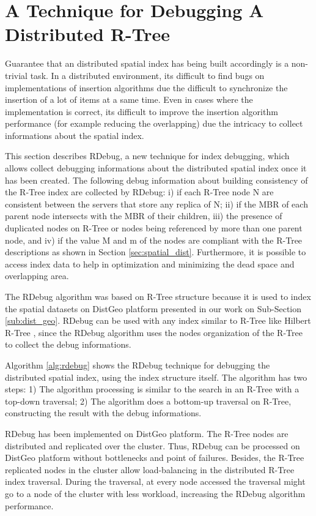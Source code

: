 \section{A Technique for Debugging A Distributed R-Tree}

\label{sec:rdebug}
Guarantee that an distributed spatial index has being built accordingly is a non-trivial task. 
In a distributed environment, its difficult to find bugs on implementations of insertion algorithms due the difficult to synchronize the insertion of a lot of items at a same time. 
Even in cases where the implementation is correct, its difficult to improve the insertion algorithm performance (for example reducing the overlapping) 
due the intricacy to collect informations about the spatial index.

This section describes RDebug, a new technique for index debugging, which allows collect debugging informations about the distributed spatial index once it has been created. 
The following debug information about building consistency of the R-Tree index are collected by RDebug: 
i) if each R-Tree node N are consistent between the servers that store any replica of N;
ii) if the MBR of each parent node intersects with the MBR of their children, 
iii) the presence of duplicated nodes on R-Tree or nodes being referenced by more than one parent node, and 
iv) if the value M and m of the nodes are compliant with the R-Tree descriptions as shown in Section \ref{sec:spatial_dist}. 
Furthermore, it is possible to access index data to help in optimization and minimizing  the dead space and overlapping area.

The RDebug algorithm was based on R-Tree structure because it is used to index the spatial datasets on DistGeo platform presented in our work on Sub-Section \ref{sub:dist_geo}.
RDebug can be used with any index similar to R-Tree like Hilbert R-Tree \cite{kamel1994hilbert}, 
since the RDebug algorithm uses the nodes organization of the R-Tree to collect the debug informations.

Algorithm \ref{alg:rdebug} shows the RDebug technique for debugging the distributed spatial index, using the index structure itself. The algorithm has two steps:
1) The algorithm processing is similar to the search in an R-Tree with a top-down traversal; 
2) The algorithm does a bottom-up traversal on R-Tree, constructing the result with the debug informations.

RDebug has been implemented on DistGeo platform. The R-Tree nodes are distributed and replicated over the cluster. 
Thus, RDebug can be processed on DistGeo platform without bottlenecks and point of failures. 
Besides, the R-Tree replicated nodes in the cluster allow load-balancing in the distributed R-Tree index traversal. 
During the traversal, at every node accessed the traversal might go to a node of the cluster with less workload, increasing the RDebug algorithm performance. 

